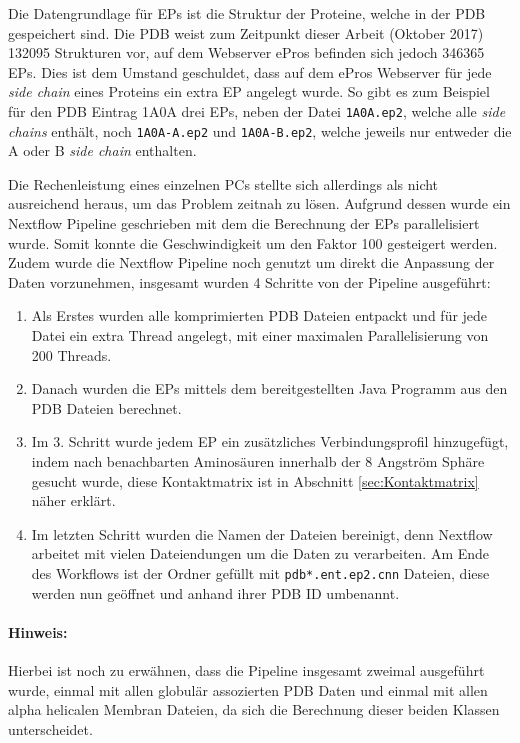 Die Datengrundlage für \ac{EP}s ist die Struktur der Proteine, welche in der \ac{PDB} gespeichert sind. Die \ac{PDB} weist zum Zeitpunkt dieser Arbeit (Oktober 2017) 132095 Strukturen vor, auf dem Webserver ePros befinden sich jedoch 346365 \ac{EP}s. Dies ist dem Umstand geschuldet, dass auf dem ePros Webserver für jede \emph{side chain} eines Proteins ein extra \ac{EP} angelegt wurde. So gibt es zum Beispiel für den \ac{PDB} Eintrag 1A0A drei \ac{EP}s, neben der Datei \texttt{1A0A.ep2}, welche alle \emph{side chains} enthält, noch \texttt{1A0A-A.ep2} und \texttt{1A0A-B.ep2}, welche jeweils nur entweder die A oder B \emph{side chain} enthalten.

Die Rechenleistung eines einzelnen PCs stellte sich allerdings als nicht ausreichend heraus, um das Problem zeitnah zu lösen. Aufgrund dessen wurde ein Nextflow Pipeline geschrieben mit dem die Berechnung der \ac{EP}s  parallelisiert wurde. Somit konnte die Geschwindigkeit um den Faktor 100 gesteigert werden. Zudem wurde die Nextflow Pipeline noch genutzt um direkt die Anpassung der Daten vorzunehmen, insgesamt wurden 4 Schritte von der Pipeline ausgeführt:

\begin{enumerate}
    \item
        Als Erstes wurden alle komprimierten \ac{PDB} Dateien entpackt und für jede Datei ein extra Thread angelegt, mit einer maximalen Parallelisierung von 200 Threads.
    \item 
        Danach wurden die \ac{EP}s  mittels dem bereitgestellten Java Programm aus den \ac{PDB} Dateien berechnet.
    \item
        Im 3. Schritt wurde jedem \ac{EP} ein zusätzliches Verbindungsprofil hinzugefügt, indem nach benachbarten Aminosäuren innerhalb der 8 Angström Sphäre gesucht wurde, diese Kontaktmatrix ist in Abschnitt \ref{sec:Kontaktmatrix} näher erklärt.
    \item
        Im letzten Schritt wurden die Namen der Dateien bereinigt, denn Nextflow arbeitet mit vielen Dateiendungen um die Daten zu verarbeiten. Am Ende des Workflows ist der Ordner gefüllt mit \texttt{pdb*.\-ent.\-ep2.\-cnn} Dateien, diese werden nun geöffnet und anhand ihrer \ac{PDB} ID umbenannt.
\end{enumerate}

\paragraph{Hinweis:} Hierbei ist noch zu erwähnen, dass die Pipeline insgesamt zweimal ausgeführt wurde, einmal mit allen globulär assozierten \ac{PDB} Daten und einmal mit allen alpha helicalen Membran Dateien, da sich die Berechnung dieser beiden Klassen unterscheidet.

